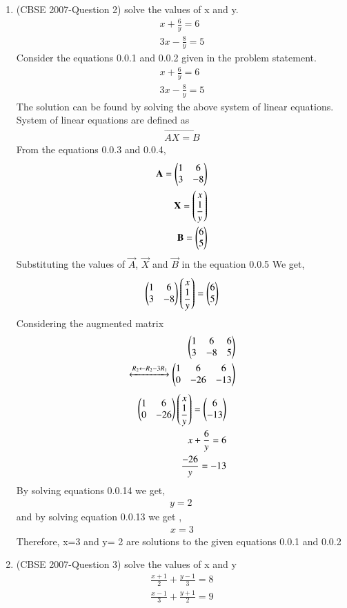 \documentclass[journal,12pt,twocolumn]{IEEEtran}
\begin{document}
\begin{enumerate}
\item (CBSE 2007-Question 2)
solve the values of x and y.
\begin{align}
x+\displaystyle\frac{6}{y}=6\\
3x-\displaystyle\frac{8}{y}=5
\end{align}
\solution Consider the equations 0.0.1 and 0.0.2 given in the problem statement.
\begin{align}
x+\displaystyle\frac{6}{y}=6\\
3x-\displaystyle\frac{8}{y}=5
\end{align}
The solution can be found by solving the above system of linear equations.\\ 
System of linear equations are defined as 
\begin{align}
\vec{AX=B}
\end{align}
From the equations 0.0.3 and 0.0.4, 
\begin{align}
\vec{A}= \myvec{1 &6\\3  & -8}\\
\medskip
\vec{X}= \myvec{ x\\ \displaystyle\frac{1}{y}}\\
\medskip
\vec{B}= \myvec{6\\5}  
\end{align} 
Substituting the values of $\vec{A}$, $\vec{X}$ and $\vec{B}$ in the equation 0.0.5
We get,
\begin{align}
\begin{pmatrix}1&6\\3&-8\end{pmatrix} \begin{pmatrix}x\\\displaystyle\frac{1}{y}\end{pmatrix}= \begin{pmatrix}6\\5\end{pmatrix}
\end{align}
Considering the augmented matrix 
 \begin{align}
  \begin{pmatrix}1&6&6\\3&-8&5\end{pmatrix}\\ 
 \xleftrightarrow[]{ R_2 \leftarrow R_2 - 3R_1}
  \begin{pmatrix}1&6&6\\0&-26&-13\end{pmatrix}
 \end{align}
 \begin{align}
\myvec{1&6\\0&-26} \myvec{x\\\displaystyle\frac{1}{y}}= \myvec{6\\-13}\\
\medskip
x+\displaystyle\frac{6}{y}= 6\\
\medskip
\displaystyle\frac{-26}{y}=-13
\end{align}
By solving equations 0.0.14 we get,
\begin{align}
y= 2\
\end{align}
and by solving equation 0.0.13 we get ,
\begin{align}
x=3
\end{align}
Therefore, x=3 and y= 2 are solutions to the given equations 0.0.1 and 0.0.2
\bigskip
\item (CBSE 2007-Question 3)
solve the values of x and y
\begin{align}
\displaystyle\frac{x+1}{2}+\displaystyle\frac{y-1}{3}=8\\
\displaystyle\frac{x-1}{3}+\displaystyle\frac{y+1}{2}=9\end{align}


\end{enumerate}
\end{document}
